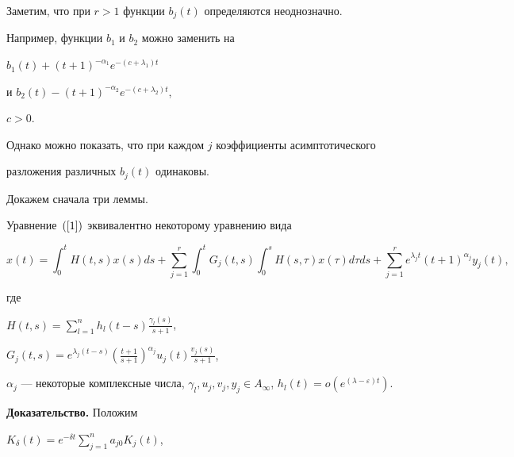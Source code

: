 Заметим, что при $r>1$ функции $b_j(t)$ определяются неоднозначно.


Например, функции $b_1$ и $b_2$ можно заменить на


$b_1 (t)+(t+1)^{-\alpha_1}e^{- (c+\lambda_1)t}$


и $b_2 (t)- (t+1)^{-\alpha_2}e^{- (c+\lambda_2)t}$,


$c>0$.


Однако можно показать, что при каждом $j$ коэффициенты асимптотического 


разложения различных $b_j(t)$ одинаковы.





Докажем сначала три леммы.





\begin{lem}


Уравнение~$(\ref{1})$ эквивалентно некоторому уравнению вида


\begin{equation}


\label{5}


x(t)=\int_0^t H(t,s)x(s)ds+\sum\limits_{j=1}^r \int_0^t G_j(t,s)


\int_0^s H(s,\tau)x(\tau)d\tau ds+


\sum\limits_{j=1}^r e^{\lambda_j t}


(t+1)^{\alpha_j} y_j(t),


\end{equation}


где


$H(t,s)=\sum\limits_{l=1}^n h_l(t-s) \frac {\gamma_l(s)}{s+1}$,


$G_j(t, s)=e^{\lambda_j(t-s)} (\frac {t+1} {s+1})^{\alpha_j}


u_j(t)\frac {v_j(s)}{s+1}$,


$\alpha_j$ --- некоторые комплексные числа, $\gamma_l,


u_j, v_j, y_j \in A_{\infty}$, $h_l(t)=o (e^{(\lambda-


\varepsilon)t})$.


\end{lem}








{\bf Доказательство.} Положим 


$K_{\delta}(t)=e^{-\delta t} \sum\limits_{j=1}^na_{j0}K_{j}(t)$, 


